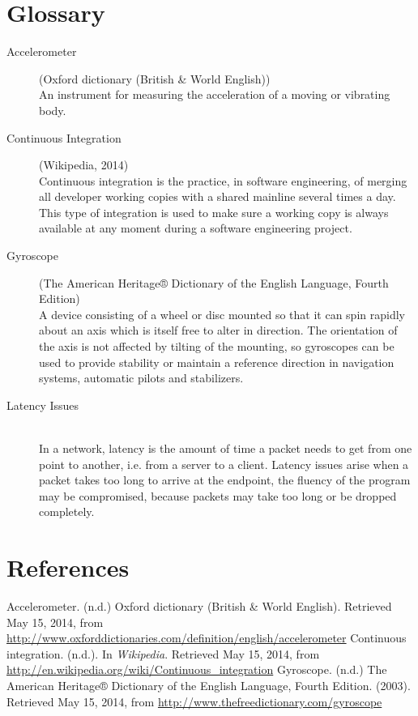 \documentclass[11pt,twoside,a4paper]{article}
\begin{document}
\section{Glossary}
\begin{description}
\item[Accelerometer] (Oxford dictionary (British \& World English)) \hfill \\
An instrument for measuring the acceleration of a moving or vibrating body.
\item[Continuous Integration] (Wikipedia, 2014) \hfill \\
Continuous integration is the practice, in software engineering, of merging all developer working copies with a shared mainline several times a day. This type of integration is used to make sure a working copy is always available at any moment during a software engineering project.
\item[Gyroscope] (The American Heritage® Dictionary of the English Language, Fourth Edition)\hfill \\
A device consisting of a wheel or disc mounted so that it can spin rapidly about an axis which is itself free to alter in direction. The orientation of the axis is not affected by tilting of the mounting, so gyroscopes can be used to provide stability or maintain a reference direction in navigation systems, automatic pilots and stabilizers.
\item[Latency Issues] \hfill \\
In a network, latency is the amount of time a packet needs to get from one point to another, i.e. from a server to a client. Latency issues arise when a packet takes too long to arrive at the endpoint, the fluency of the program may be compromised, because packets may take too long or be dropped completely. 
\end{description}


\clearpage

\section*{References}
Accelerometer. (n.d.) Oxford dictionary (British \& World English). Retrieved May 15, 2014, from \url{http://www.oxforddictionaries.com/definition/english/accelerometer}
\newline \newline
Continuous integration. (n.d.). In \textit{Wikipedia}. Retrieved May 15, 2014, from \url{http://en.wikipedia.org/wiki/Continuous_integration}
\newline \newline
Gyroscope. (n.d.) The American Heritage® Dictionary of the English Language, Fourth Edition. (2003). Retrieved May 15, 2014, from \url{http://www.thefreedictionary.com/gyroscope}
\end{document}
